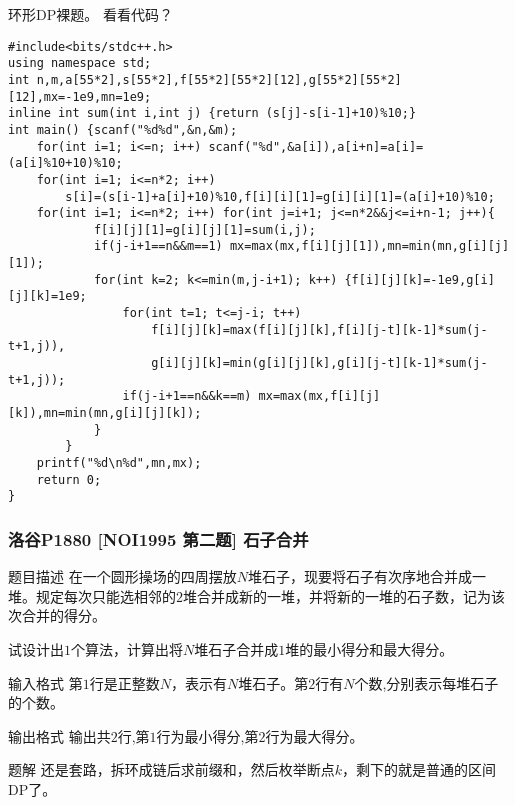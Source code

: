 \documentclass[UTF-8,aspectratio=1610]{ctexbeamer}
\begin{document}
\begin{frame}[fragile]
环形DP裸题。\pause
看看代码？\pause
\begin{verbatim}
#include<bits/stdc++.h> 
using namespace std;
int n,m,a[55*2],s[55*2],f[55*2][55*2][12],g[55*2][55*2][12],mx=-1e9,mn=1e9;
inline int sum(int i,int j) {return (s[j]-s[i-1]+10)%10;}
int main() {scanf("%d%d",&n,&m);
    for(int i=1; i<=n; i++) scanf("%d",&a[i]),a[i+n]=a[i]=(a[i]%10+10)%10;
    for(int i=1; i<=n*2; i++)
        s[i]=(s[i-1]+a[i]+10)%10,f[i][i][1]=g[i][i][1]=(a[i]+10)%10;
    for(int i=1; i<=n*2; i++) for(int j=i+1; j<=n*2&&j<=i+n-1; j++){
            f[i][j][1]=g[i][j][1]=sum(i,j);
            if(j-i+1==n&&m==1) mx=max(mx,f[i][j][1]),mn=min(mn,g[i][j][1]);
            for(int k=2; k<=min(m,j-i+1); k++) {f[i][j][k]=-1e9,g[i][j][k]=1e9;
                for(int t=1; t<=j-i; t++)
                    f[i][j][k]=max(f[i][j][k],f[i][j-t][k-1]*sum(j-t+1,j)),
                    g[i][j][k]=min(g[i][j][k],g[i][j-t][k-1]*sum(j-t+1,j));
                if(j-i+1==n&&k==m) mx=max(mx,f[i][j][k]),mn=min(mn,g[i][j][k]);
            }
        }
    printf("%d\n%d",mn,mx);
    return 0;
}
\end{verbatim}
\end{frame}
\begin{frame}
\frametitle{洛谷P1880 [NOI1995 第二题] 石子合并}
\begin{block}{题目描述}
在一个圆形操场的四周摆放$N$堆石子，现要将石子有次序地合并成一堆。规定每次只能选相邻的$2$堆合并成新的一堆，并将新的一堆的石子数，记为该次合并的得分。

试设计出$1$个算法，计算出将$N$堆石子合并成$1$堆的最小得分和最大得分。
\end{block}
\begin{alertblock}{输入格式}
第$1$行是正整数$N$，表示有$N$堆石子。第$2$行有$N$个数,分别表示每堆石子的个数。
\end{alertblock}
\begin{exampleblock}{输出格式}
输出共$2$行,第$1$行为最小得分,第$2$行为最大得分。
\end{exampleblock}
\pause
\begin{alertblock}{题解}
还是套路，拆环成链后求前缀和，然后枚举断点$k$，剩下的就是普通的区间DP了。
\end{alertblock}
\end{frame}
\end{document}
